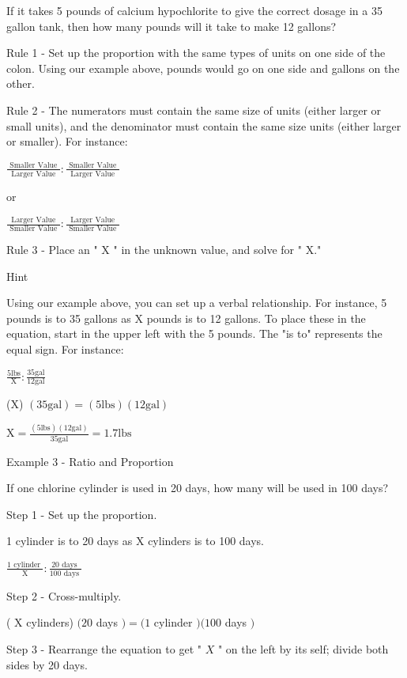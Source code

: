 \documentclass[10pt]{article}
\begin{document}
If it takes 5 pounds of calcium hypochlorite to give the correct dosage in a 35 gallon tank, then how many pounds will it take to make 12 gallons?

Rule 1 - Set up the proportion with the same types of units on one side of the colon. Using our example above, pounds would go on one side and gallons on the other.

Rule 2 - The numerators must contain the same size of units (either larger or small units), and the denominator must contain the same size units (either larger or smaller). For instance:

$\frac{\text { Smaller Value }}{\text { Larger Value }}: \frac{\text { Smaller Value }}{\text { Larger Value }}$

or

$\frac{\text { Larger Value }}{\text { Smaller Value }}: \frac{\text { Larger Value }}{\text { Smaller Value }}$

Rule 3 - Place an " $\mathrm{X}$ " in the unknown value, and solve for " $\mathrm{X}$."

Hint

Using our example above, you can set up a verbal relationship. For instance, 5 pounds is to 35 gallons as $\mathrm{X}$ pounds is to 12 gallons. To place these in the equation, start in the upper left with the 5 pounds. The "is to" represents the equal sign. For instance:

$\frac{5 \mathrm{lbs}}{\mathrm{X}}: \frac{35 \mathrm{gal}}{12 \mathrm{gal}}$

(X) $(35 \mathrm{gal})=(5 \mathrm{lbs})(12 \mathrm{gal})$

$\mathrm{X}=\frac{(5 \mathrm{lbs})(12 \mathrm{gal})}{35 \mathrm{gal}}=1.7 \mathrm{lbs}$

Example 3 - Ratio and Proportion

If one chlorine cylinder is used in 20 days, how many will be used in 100 days?

Step 1 - Set up the proportion.

1 cylinder is to 20 days as $\mathrm{X}$ cylinders is to 100 days.

$\frac{1 \text { cylinder }}{\mathrm{X}}: \frac{20 \text { days }}{100 \text { days }}$

Step 2 - Cross-multiply.

( $\mathrm{X}$ cylinders) $(20$ days $)=(1$ cylinder $)(100$ days $)$

Step 3 - Rearrange the equation to get " $X$ " on the left by its self; divide both sides by 20 days.
\end{document}
